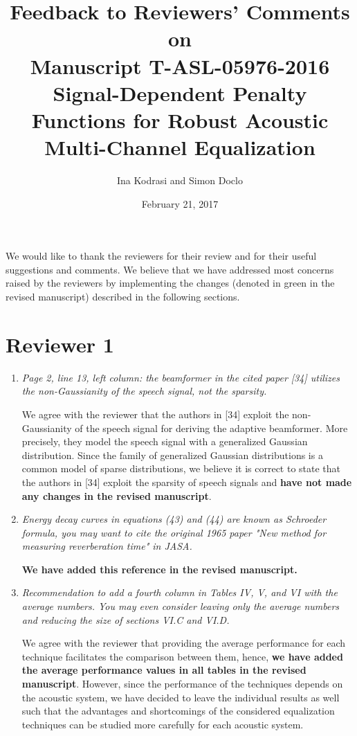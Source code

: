 \documentclass[9pt, a4paper]{article}
\begin{document}
\author{Ina Kodrasi and Simon Doclo}
\title{\bf Feedback to Reviewers' Comments on \\ Manuscript T-ASL-05976-2016 \\ Signal-Dependent Penalty Functions for Robust Acoustic Multi-Channel Equalization}
\date{February 21, 2017} 
\maketitle

We would like to thank the reviewers for their review and for their useful suggestions and comments. 
We believe that we have addressed most concerns raised by the reviewers by implementing the changes (denoted in green in the revised manuscript) described in the following sections.


\section{Reviewer 1}

\begin{enumerate}
\item {\textit{Page 2, line 13, left column: the beamformer in the cited paper [34] utilizes the non-Gaussianity of the speech signal, not the sparsity. }}

We agree with the reviewer that the authors in [34] exploit the non-Gaussianity of the speech signal for deriving the adaptive beamformer. 
More precisely, they model the speech signal with a generalized Gaussian distribution.
Since the family of generalized Gaussian distributions is a common model of sparse distributions, we believe it is correct to state that the authors in [34] exploit the sparsity of speech signals and {\textbf{have not made any changes in the revised manuscript}}.

\item {\textit{Energy decay curves in equations (43) and (44) are known as Schroeder formula, you may want to cite the original 1965 paper "New method for measuring reverberation time" in JASA. }}

\textbf{We have added this reference in the revised manuscript.}

\item {\textit{Recommendation to add a fourth column in Tables IV, V, and VI with the average numbers. You may even consider leaving only the average numbers and reducing the size of sections VI.C and VI.D.}}

We agree with the reviewer that providing the average performance for each technique facilitates the comparison between them, hence, \textbf{we have added the average performance values in all tables in the revised manuscript}.
However, since the performance of the techniques depends on the acoustic system, we have decided to leave the individual results as well such that the advantages and shortcomings of the considered equalization techniques can be studied more carefully for each acoustic system.

\end{enumerate}
\end{document}
